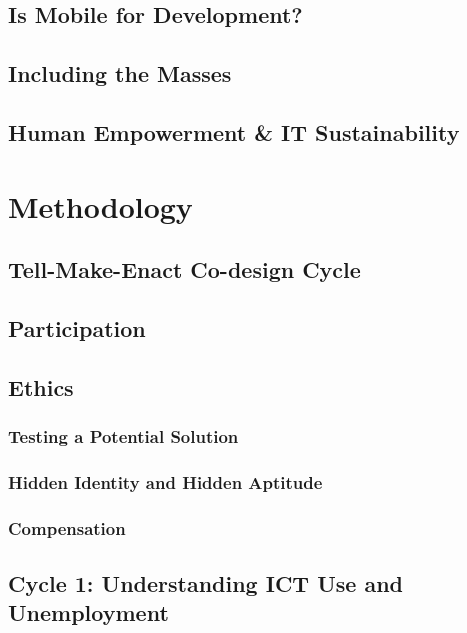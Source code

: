 \documentclass[12pt,a4paper,oneside]{report}
\begin{document}
\section{Is Mobile for Development?}

\section{Including the Masses}

\section{Human Empowerment \& IT Sustainability}


\chapter{Methodology}

\section{Tell-Make-Enact Co-design Cycle}

\section{Participation}

\section{Ethics}
\subsection{Testing a Potential Solution}
\subsection{Hidden Identity and Hidden Aptitude}
\subsection{Compensation}

\section{Cycle 1: Understanding ICT Use and Unemployment}
\end{document}
